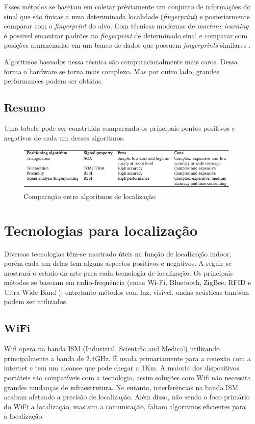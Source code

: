 Esses métodos se baseiam em coletar préviamente um conjunto de informações do sinal que são únicas a uma deteriminada localidade (\textit{fingerprint}) e posteriormente comparar com o \textit{fingerprint} do alvo. Com técnicas modernas de \textit{machine learning} é possivel encontrar padrões no \textit{fingerprint} de determinado sinal e comparar com posições armazenadas em um banco de dados que possuem \textit{fingerprints} similares \cite{art13}.

Algoritmos baseados nessa técnica são computacionalmente mais caros. Dessa forma o hardware se torna mais complexo. Mas por outro lado, grandes performances podem ser obtidas.

\subsection{Resumo}

Uma tabela pode ser construída comparando os principais pontos positivos e negativos de cada um desses algoritmos.
\begin{figure}[H]
	\centering 
	\includegraphics[scale = 1]{images/algorithms_table.png}
	\caption{Comparação entre algoritmos de localização \cite{art1}}
	\label{fig:algorithms_table.png}
\end{figure}

\section{Tecnologias para localização}
Diversas tecnologias têm-se mostrado úteis na função de localização indoor, porém cada um delas tem alguns aspectos positivos e negativos. A seguir se mostrará o estado-da-arte para cada tecnologia de localização. Os principais métodos se baseiam em radio-frequência (como Wi-Fi, Bluetooth, ZigBee, RFID e Ultra Wide Band ), entretanto métodos com luz, visível, ondas acústicas também podem ser utilizados.

\subsection{WiFi}
Wifi opera na banda ISM (Industrial, Scientific and Medical) utilizando principalmente a banda de 2.4GHz. É usada primariamente para a conexão com a internet e tem um alcance que pode chegar a 1Km. A maioria dos dispositivos portáteis são compatíveis com a tecnologia, assim soluções com Wifi não necessita grandes mudanças de infraestrutura. No entanto, interferências na banda ISM acabam afetando a precisão de localização. Além disso, não sendo o foco primário do WiFi a localização, mas sim a comunicação, faltam algoritmos eficientes para a localização.

